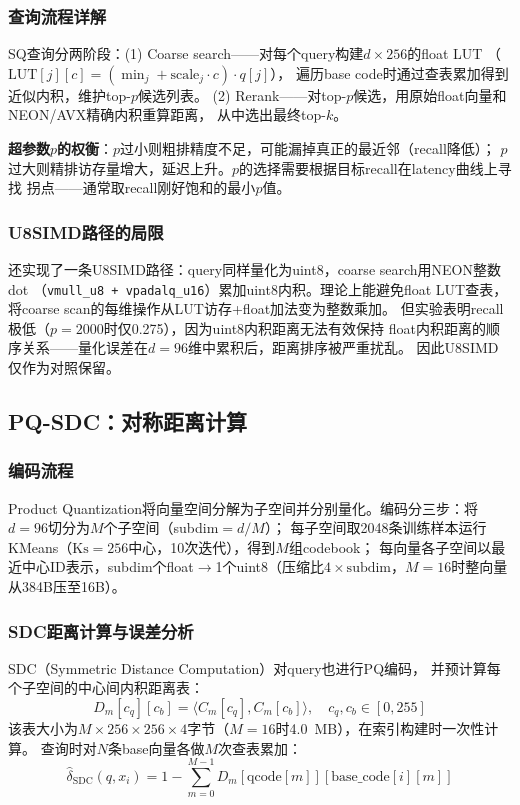 \documentclass[11pt,a4paper]{article}
\begin{document}
\subsubsection{查询流程详解}

SQ查询分两阶段：(1) Coarse search——对每个query构建$d\times 256$的float LUT
（$\text{LUT}[j][c]=(\min_j+\text{scale}_j\cdot c)\cdot q[j]$），
遍历base code时通过查表累加得到近似内积，维护top-$p$候选列表。
(2) Rerank——对top-$p$候选，用原始float向量和NEON/AVX精确内积重算距离，
从中选出最终top-$k$。

\textbf{超参数$p$的权衡}：$p$过小则粗排精度不足，可能漏掉真正的最近邻（recall降低）；
$p$过大则精排访存量增大，延迟上升。$p$的选择需要根据目标recall在latency曲线上寻找
拐点——通常取recall刚好饱和的最小$p$值。

\subsubsection{U8SIMD路径的局限}

还实现了一条U8SIMD路径：query同样量化为uint8，coarse search用NEON整数dot
（\texttt{vmull\_u8 + vpadalq\_u16}）累加uint8内积。理论上能避免float LUT查表，
将coarse scan的每维操作从LUT访存+float加法变为整数乘加。
但实验表明recall极低（$p=2000$时仅0.275），因为uint8内积距离无法有效保持
float内积距离的顺序关系——量化误差在$d=96$维中累积后，距离排序被严重扰乱。
因此U8SIMD仅作为对照保留。

\subsection{PQ-SDC：对称距离计算}

\subsubsection{编码流程}

Product Quantization将向量空间分解为子空间并分别量化。编码分三步：将$d=96$切分为$M$个子空间（subdim$=d/M$）；
每子空间取2048条训练样本运行KMeans（$\text{Ks}=256$中心，10次迭代），得到$M$组codebook；
每向量各子空间以最近中心ID表示，subdim个float$\to$1个uint8（压缩比$4\times\text{subdim}$，$M=16$时整向量从384B压至16B）。

\subsubsection{SDC距离计算与误差分析}

SDC（Symmetric Distance Computation）对query也进行PQ编码，
并预计算每个子空间的中心间内积距离表：
\begin{equation}
D_m[c_q][c_b] = \langle C_m[c_q], C_m[c_b] \rangle, \quad c_q, c_b \in [0, 255]
\end{equation}
该表大小为$M\times 256\times 256\times 4$字节（$M=16$时4.0~MB），在索引构建时一次性计算。
查询时对$N$条base向量各做$M$次查表累加：
\begin{equation}
\hat{\delta}_{\text{SDC}}(q, x_i) = 1 - \sum_{m=0}^{M-1} D_m[\text{qcode}[m]][\text{base\_code}[i][m]]
\end{equation}
\end{document}
